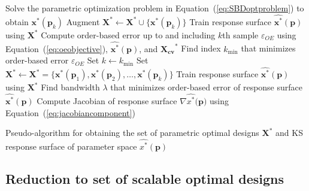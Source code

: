 \begin{algorithm}
	\DontPrintSemicolon %
	 {
		Solve the parametric optimization problem in Equation~(\ref{eq:SBDoptproblem}) to obtain $\mathbf{x}^*(\mathbf{p}_k)$\;
		Augment $\mathbf{X}^* \gets \mathbf{X}^* \cup \{ \mathbf{x}^*(\mathbf{p}_k) \} $\;
		Train response surface $\hat{\mathbf{x}^*}(\mathbf{p})$ using $\mathbf{X}^*$\;
		Compute order-based error up to and including $k$th sample $\varepsilon_{OE}$ using Equation~(\ref{eq:oeobjective}), $\hat{\mathbf{x}^*}(\mathbf{p})$, and $\mathbf{X_{cv}}^*$\;
	}
	Find index $k_{\textrm{min}}$ that minimizes order-based error $\varepsilon_{OE}$\;
	Set $k \gets k_{\textrm{min}} $ \;
	Set $\mathbf{X}^* \gets \mathbf{X}^*= \{ \mathbf{x}^*(\mathbf{p}_1),\mathbf{x}^*(\mathbf{p}_2),\ldots,\mathbf{x}^*(\mathbf{p}_k) \} $ \;
	Train response surface $\hat{\mathbf{x}^*}(\mathbf{p})$ using $\mathbf{X}^*$ \;
	Find bandwidth $\lambda$ that minimizes order-based error of response surface $\hat{\mathbf{x}^*}(\mathbf{p})$\;
	Compute Jacobian of response surface $\nabla\hat{{x}^*}(\mathbf{p)}$ using Equation~(\ref{eq:jacobiancomponent})\;
	\caption{Pseudo-algorithm for obtaining the set of parametric optimal designs $\mathbf{X}^*$ and \ac{KS} response surface of parameter space $\hat{{x}^*}(\mathbf{p})$}
	\label{algo:PODalgo}
\end{algorithm}

\subsection{Reduction to set of scalable optimal designs} \label{subsec:SBDfAM}

